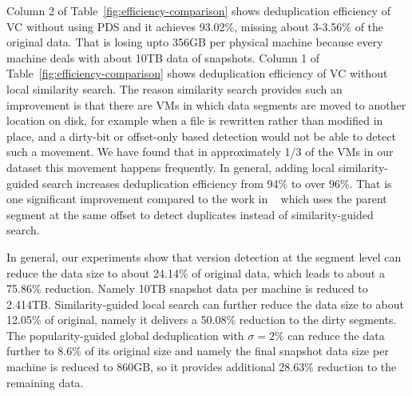 Column 2 of Table~\ref{fig:efficiency-comparison} shows deduplication efficiency of VC without 
using PDS and it achieves 93.02\%, missing about 3-3.56\% of the original data. That is losing upto
356GB per physical machine because every machine deals with about 10TB data of snapshots. 
Column 1 of Table~\ref{fig:efficiency-comparison} shows deduplication efficiency of VC without 
local similarity search.
The reason similarity search provides such an improvement is that
there are VMs in which
data  segments are moved to another location on disk, for example when a file is rewritten
rather than modified in place,  
and a dirty-bit or offset-only based detection would not be able to detect such a movement.
We have found that in
approximately 1/3 of the VMs in our dataset this movement happens frequently.
In general, adding local similarity-guided search increases deduplication efficiency from 94\% to over 96\%.
That is one significant improvement compared to the work in ~\cite{WeiZhangIEEE}
which uses the parent segment at the same offset to detect duplicates instead of similarity-guided search.

In general, our experiments show that
version detection at the segment level can reduce the data size to about 24.14\% of original data, 
which leads to about a 75.86\% reduction. Namely 10TB snapshot data per machine is reduced to 2.414TB.
Similarity-guided local search can further reduce the data size
to about 12.05\% of original, namely it delivers a 50.08\% reduction to the dirty segments.
The popularity-guided global deduplication with $\sigma=2\% $
can reduce the data further to 8.6\% of its original size and namely the final snapshot data size per machine
is reduced to 860GB, so it provides additional 28.63\% reduction to the remaining data.


